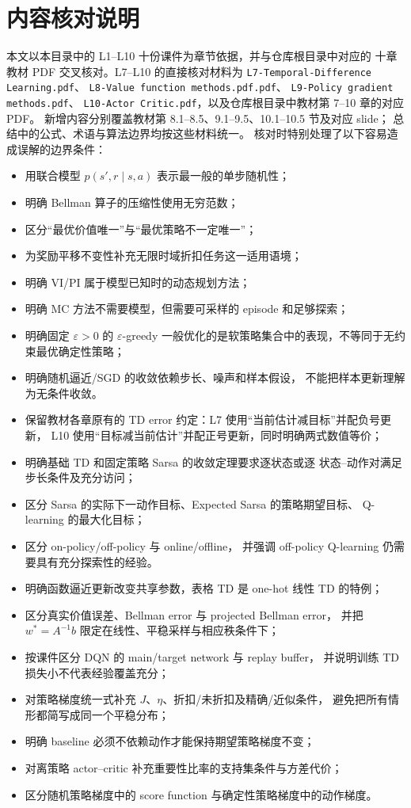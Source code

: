 \documentclass[11pt,a4paper,fontset=fandol]{ctexart}
\begin{document}
\section*{内容核对说明}

本文以本目录中的 L1--L10 十份课件为章节依据，并与仓库根目录中对应的
十章教材 PDF 交叉核对。L7--L10 的直接核对材料为
\texttt{L7-Temporal-Difference Learning.pdf}、
\texttt{L8-Value function methods.pdf.pdf}、
\texttt{L9-Policy gradient methods.pdf}、
\texttt{L10-Actor Critic.pdf}，以及仓库根目录中教材第 7--10 章的对应 PDF。
新增内容分别覆盖教材第 8.1--8.5、9.1--9.5、10.1--10.5 节及对应 slide；
总结中的公式、术语与算法边界均按这些材料统一。
核对时特别处理了以下容易造成误解的边界条件：

\begin{itemize}
  \item 用联合模型 \(p(s',r\mid s,a)\) 表示最一般的单步随机性；
  \item 明确 Bellman 算子的压缩性使用无穷范数；
  \item 区分“最优价值唯一”与“最优策略不一定唯一”；
  \item 为奖励平移不变性补充无限时域折扣任务这一适用语境；
  \item 明确 VI/PI 属于模型已知时的动态规划方法；
  \item 明确 MC 方法不需要模型，但需要可采样的 episode 和足够探索；
  \item 明确固定 \(\varepsilon>0\) 的 \(\varepsilon\)-greedy
  一般优化的是软策略集合中的表现，不等同于无约束最优确定性策略；
  \item 明确随机逼近/SGD 的收敛依赖步长、噪声和样本假设，
  不能把样本更新理解为无条件收敛。
  \item 保留教材各章原有的 TD error 约定：L7 使用“当前估计减目标”并配负号更新，
  L10 使用“目标减当前估计”并配正号更新，同时明确两式数值等价；
  \item 明确基础 TD 和固定策略 Sarsa 的收敛定理要求逐状态或逐
  状态--动作对满足步长条件及充分访问；
  \item 区分 Sarsa 的实际下一动作目标、Expected Sarsa 的策略期望目标、
  Q-learning 的最大化目标；
  \item 区分 on-policy/off-policy 与 online/offline，
  并强调 off-policy Q-learning 仍需要具有充分探索性的经验。
  \item 明确函数逼近更新改变共享参数，表格 TD 是 one-hot 线性 TD 的特例；
  \item 区分真实价值误差、Bellman error 与 projected Bellman error，
  并把 \(w^*=A^{-1}b\) 限定在线性、平稳采样与相应秩条件下；
  \item 按课件区分 DQN 的 main/target network 与 replay buffer，
  并说明训练 TD 损失小不代表经验覆盖充分；
  \item 对策略梯度统一式补充 \(J\)、\(\eta\)、折扣/未折扣及精确/近似条件，
  避免把所有情形都简写成同一个平稳分布；
  \item 明确 baseline 必须不依赖动作才能保持期望策略梯度不变；
  \item 对离策略 actor--critic 补充重要性比率的支持集条件与方差代价；
  \item 区分随机策略梯度中的 score function 与确定性策略梯度中的动作梯度。
\end{itemize}
\end{document}
